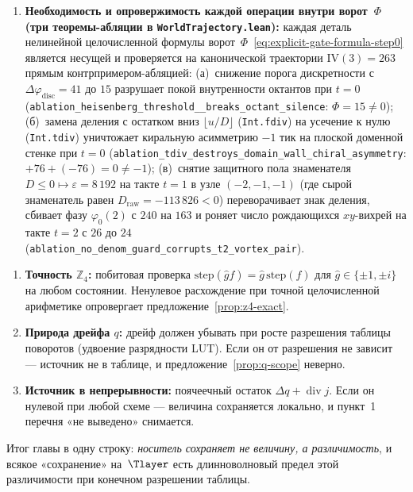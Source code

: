 \begin{enumerate}[nosep,leftmargin=*]
\item \textbf{Необходимость и опровержимость каждой операции внутри ворот~$\Phi$ (три теоремы-абляции в \texttt{WorldTrajectory.lean}):}
  каждая деталь нелинейной целочисленной формулы ворот~$\Phi$~\eqref{eq:explicit-gate-formula-step0} является несущей и проверяется на канонической траектории $\mathrm{IV}(3)=263$ прямым контрпримером-абляцией:
  (а)~снижение порога дискретности с $\Delta\varphi_{\mathrm{disc}}=41$ до $15$ разрушает покой внутренности октантов при $t=0$ (\texttt{ablation\_\allowbreak heisenberg\_\allowbreak threshold\_\_\allowbreak breaks\_\allowbreak octant\_\allowbreak silence}: $\Phi=15\ne 0$);
  (б)~замена деления с остатком вниз $\lfloor u/D\rfloor$ (\texttt{Int.fdiv}) на усечение к нулю (\texttt{Int.tdiv}) уничтожает киральную асимметрию $-1$ тик на плоской доменной стенке при $t=0$ (\texttt{ablation\_\allowbreak tdiv\_\allowbreak destroys\_\allowbreak domain\_\allowbreak wall\_\allowbreak chiral\_\allowbreak asymmetry}: $+76+(-76)=0\ne -1$);
  (в)~снятие защитного пола знаменателя $D\le 0\mapsto\varepsilon=8\,192$ на такте $t=1$ в узле $(-2,-1,-1)$ (где сырой знаменатель равен $D_{\mathrm{raw}}=-113\,826<0$) переворачивает знак деления, сбивает фазу $\varphi_0(2)$ с $240$ на $163$ и роняет число рождающихся $xy$-вихрей на такте $t=2$ с $26$ до $24$ (\texttt{ablation\_\allowbreak no\_\allowbreak denom\_\allowbreak guard\_\allowbreak corrupts\_\allowbreak t2\_\allowbreak vortex\_\allowbreak pair}).
\end{enumerate}

\begin{enumerate}[leftmargin=*]
\item \textbf{Точность $\mathbb{Z}_4$:} побитовая проверка
  $\mathrm{step}(\hat g f)=\hat g\,\mathrm{step}(f)$ для $\hat g\in\{\pm1,\pm i\}$
  на любом состоянии. Ненулевое расхождение при точной целочисленной арифметике
  опровергает предложение~\ref{prop:z4-exact}.
\item \textbf{Природа дрейфа $q$:} дрейф должен убывать при росте разрешения таблицы
  поворотов (удвоение разрядности LUT). Если он от разрешения не зависит ---
  источник не в таблице, и предложение~\ref{prop:q-scope} неверно.
\item \textbf{Источник в непрерывности:} поячеечный остаток
  $\Delta q+\operatorname{div}j$. Если он нулевой при любой схеме ---
  величина сохраняется локально, и пункт~1 перечня «не выведено» снимается.
\end{enumerate}

\noindent
Итог главы в одну строку: \emph{носитель сохраняет не величину, а различимость},
и всякое «сохранение» на~$\Tlayer$ есть длинноволновый предел этой различимости
при конечном разрешении таблицы.
